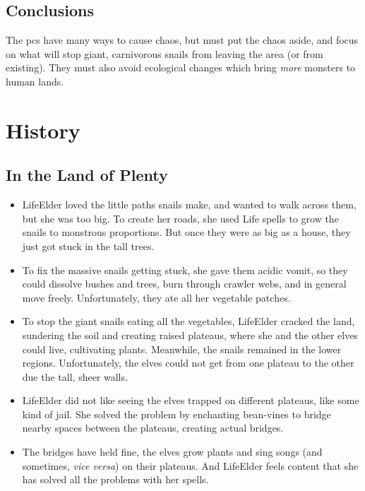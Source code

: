 \subsection{Conclusions}

The \glspl{pc} have many ways to cause chaos, but must put the chaos aside, and focus on what will stop giant, carnivorous snails from leaving the area (or from existing).
They must also avoid ecological changes which bring \emph{more} monsters to human lands.

\section{History}

\subsection{In the Land of Plenty}

\begin{itemize}
  \item
  \gls{LifeElder} loved the little paths snails make, and wanted to walk across them, but she was too big.
  To create her roads, she used Life spells to grow the snails to monstrous proportions.
  But once they were as big as a house, they just got stuck in the tall trees.
  \item
  To fix the massive snails getting stuck, she gave them acidic vomit, so they could dissolve bushes and trees, burn through \gls{crawler} webs, and in general move freely.
  Unfortunately, they ate all her vegetable patches.
  \item
  To stop the giant snails eating all the vegetables, \gls{LifeElder} cracked the land, sundering the soil and creating raised plateaus, where she and the other elves could live, cultivating plants.
  Meanwhile, the snails remained in the lower regions.
  Unfortunately, the elves could not get from one plateau to the other due the tall, sheer walls.
  \item
  \gls{LifeElder} did not like seeing the elves trapped on different plateaus, like some kind of jail.
  She solved the problem by enchanting bean-vines to bridge nearby spaces between the plateaus, creating actual bridges.
  \item
  The bridges have held fine, the elves grow plants and sing songs (and sometimes, \textit{vice versa}) on their plateaus.
  And \gls{LifeElder} feels content that she has solved all the problems with her spells.
\end{itemize}


